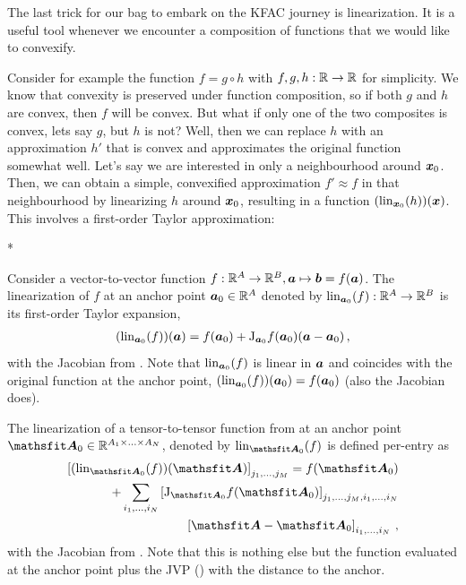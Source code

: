 The last trick for our bag to embark on the KFAC journey is linearization.
It is a useful tool whenever we encounter a composition of functions that we would like to convexify.

Consider for example the function $f = g \circ h$ with $f,g,h: {\mathbb{R}} \to {\mathbb{R}}$ for simplicity.
We know that convexity is preserved under function composition, so if both $g$ and $h$ are convex, then $f$ will be convex.
But what if only one of the two composites is convex, lets say $g$, but $h$ is not?
Well, then we can replace $h$ with an approximation $h'$ that is convex and approximates the original function somewhat well.
Let's say we are interested in only a neighbourhood around ${\bm{x}}_0$.
Then, we can obtain a simple, convexified approximation $f' \approx f$ in that neighbourhood by linearizing $h$ around ${\bm{x}}_0$, resulting in a function $(\operatorname{lin}_{{\bm{x}}_0}(h))({\bm{x}})$.
This involves a first-order Taylor approximation:

\switchcolumn[1]*
\switchcolumn[0]

\begin{definition}\label{def:vector_linearization}
  Consider a vector-to-vector function $f: {\mathbb{R}}^A \to {\mathbb{R}}^B, {\bm{a}} \mapsto {\bm{b}} = f({\bm{a}})$.
  The linearization of $f$ at an anchor point ${\bm{a}}_0 \in {\mathbb{R}}^A$ denoted by $\operatorname{lin}_{{\bm{a}}_0}(f): {\mathbb{R}}^A \to {\mathbb{R}}^B$ is its first-order Taylor expansion,
  \begin{align*}
    (\operatorname{lin}_{{\bm{a}}_0}(f))({\bm{a}}) = f({\bm{a}}_0) + \mathrm{J}_{{\bm{a}}_0}f({\bm{a}}_0) ({\bm{a}} - {\bm{a}}_0)\,,
  \end{align*}
  with the Jacobian from .
  Note that $\operatorname{lin}_{{\bm{a}}_0}(f)$ is linear in ${\bm{a}}$ and coincides with the original function at the anchor point, $(\operatorname{lin}_{{\bm{a}}_0}(f))({\bm{a}}_0) = f({\bm{a}}_0)$ (also the Jacobian does).
\end{definition}

\begin{definition}\label{def:tensor_linearization}
  The linearization of a tensor-to-tensor function from  at an anchor point $\tA_0 \in \sR^{A_1 \times \ldots \times A_N}$, denoted by $\lin_{\tA_0}(f)$ is defined per-entry as
  \begin{align*}
    \left[
    (\lin_{\tA_0}(f))(\tA)
    \right]_{j_1, \ldots, j_M}
    = f(\tA_0)
    \\
    +
    \sum_{i_1, \ldots, i_N}
    \left[
    \jac_{\tA_0}f(\tA_0)
    \right]_{j_1, \ldots, j_M, i_1, \ldots, i_N}
    \\
    \left[
    \tA - \tA_0
    \right]_{i_1, \ldots, i_N}\,,
  \end{align*}
  with the Jacobian from . Note that this is nothing else but the function evaluated at the anchor point plus the JVP () with the distance to the anchor.
\end{definition}

